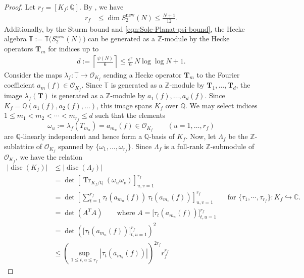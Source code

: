 \documentclass[11pt,letterpaper,reqno]{amsart}
\theoremstyle{definition}
\numberwithin{equation}{section}
\numberwithin{figure}{section}
\numberwithin{table}{section}
\newcommand{\lrb}[1]{\!\left[#1\right]}
\newcommand{\nw}{\mathrm{new}}
\begin{document}
\begin{proof}
Let $r_f = [K_f : \mathbb{Q}]$. By \cite[Theorem 2]{martin2005dimensions}, we have
\begin{align}
    r_f &\leq \dim S_2^\nw(N) \le \frac{N + 1}{12}. \label{eqn:bound-for-Hecke-degree}
\end{align}
Additionally, by the Sturm bound \cite[Theorem 2.3]{AgasheStein2005} and \eqref{eqn:Sole-Planat-psi-bound}, the Hecke algebra $\mathbb{T} := \mathbb{T}\bigl(S_2^{\mathrm{new}}(N)\bigr)$ can be generated as a $\mathbb{Z}$-module by the
Hecke operators $\mathbf{T}_m$ for indices up to
\begin{align}
    d := \left\lceil \frac{\psi(N)}{6}\right\rceil  \leq \frac{e^\gamma}{6} \, N \log \log N + 1.
\end{align}
Consider the maps $\lambda_f : \mathbb{T} \to \mathcal{O}_{K_f}$ sending a Hecke operator $\mathbf{T}_m$
to the Fourier coefficient $a_m(f) \in \mathcal{O}_{K_f}$. Since
$\mathbb{T}$ is generated as a $\mathbb{Z}$-module by $\mathbf{T}_1,\dots,\mathbf{T}_d$, the image $\lambda_f(\mathbf{T})$ is
generated as a $\mathbb{Z}$-module by $a_1(f),\dots,a_d(f)$. Since $K_f = \mathbb{Q}(a_1(f),
a_2(f),\dots)$, this image spans $K_f$ over $\mathbb{Q}$. We may
select indices $1 \le m_1 < m_2 < \cdots < m_{r_f} \le d$ such that the elements
\[
\omega_u := \lambda_f(T_{m_u}) = a_{m_u}(f) \in \mathcal{O}_{K_f} \qquad (u=1,\dots,r_f)
\]
are $\mathbb{Q}$-linearly independent and hence form a $\mathbb{Q}$-basis of $K_f$. Now, let $\Lambda_f$ be the $\mathbb{Z}$-sublattice of $\mathcal{O}_{K_f}$ spanned by
$\{\omega_1,\dots,\omega_{r_f}\}$. Since $\Lambda_f$ is a full-rank $\mathbb{Z}$-submodule of
$\mathcal{O}_{K_f}$, we have the relation
\begin{align}
    \left| \operatorname{disc}(K_f) \right| &\leq \left| \operatorname{disc}(\Lambda_f) \right|\\
    &= \det\lrb{ \operatorname{Tr}_{K_f/\mathbb{Q}}(\omega_u \omega_v) }_{u,v=1}^{r_f}\\
    &= \det\lrb{ \sum_{t=1}^{r_f} \tau_t(a_{m_u}(f))\,\tau_t(a_{m_v}(f)) }_{u,v=1}^{r_f} 
    \qquad \text{for $\{ \tau_1, \cdots, \tau_{r_f}\}: K_f \hookrightarrow \mathbb{C}.$}\\
    &= \det \left( A^T A  \right)  
    \qquad \text{where $A = {\Big[ \tau_t \left( a_{m_u}(f) \right)  \Big]_{t, u = 1}^{r_f}}$}\\
    &= \det\left( \Big[ \tau_t \left( a_{m_u}(f) \right)  \Big]_{t, u = 1}^{r_f} \right)^2\\
    &\le
        \left( \sup_{1\le t, u \le r_f} 
        |\tau_t \left( a_{m_u}(f) \right)|  \right)^{2 r_f} r_f^{r_f}

\end{align}
\end{proof}
\end{document}
